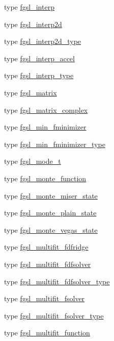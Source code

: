 \begin{DoxyCompactItemize}
\item 
type \hyperlink{structfgsl_1_1fgsl__interp}{fgsl\+\_\+interp}
\item 
type \hyperlink{structfgsl_1_1fgsl__interp2d}{fgsl\+\_\+interp2d}
\item 
type \hyperlink{structfgsl_1_1fgsl__interp2d__type}{fgsl\+\_\+interp2d\+\_\+type}
\item 
type \hyperlink{structfgsl_1_1fgsl__interp__accel}{fgsl\+\_\+interp\+\_\+accel}
\item 
type \hyperlink{structfgsl_1_1fgsl__interp__type}{fgsl\+\_\+interp\+\_\+type}
\item 
type \hyperlink{structfgsl_1_1fgsl__matrix}{fgsl\+\_\+matrix}
\item 
type \hyperlink{structfgsl_1_1fgsl__matrix__complex}{fgsl\+\_\+matrix\+\_\+complex}
\item 
type \hyperlink{structfgsl_1_1fgsl__min__fminimizer}{fgsl\+\_\+min\+\_\+fminimizer}
\item 
type \hyperlink{structfgsl_1_1fgsl__min__fminimizer__type}{fgsl\+\_\+min\+\_\+fminimizer\+\_\+type}
\item 
type \hyperlink{structfgsl_1_1fgsl__mode__t}{fgsl\+\_\+mode\+\_\+t}
\item 
type \hyperlink{structfgsl_1_1fgsl__monte__function}{fgsl\+\_\+monte\+\_\+function}
\item 
type \hyperlink{structfgsl_1_1fgsl__monte__miser__state}{fgsl\+\_\+monte\+\_\+miser\+\_\+state}
\item 
type \hyperlink{structfgsl_1_1fgsl__monte__plain__state}{fgsl\+\_\+monte\+\_\+plain\+\_\+state}
\item 
type \hyperlink{structfgsl_1_1fgsl__monte__vegas__state}{fgsl\+\_\+monte\+\_\+vegas\+\_\+state}
\item 
type \hyperlink{structfgsl_1_1fgsl__multifit__fdfridge}{fgsl\+\_\+multifit\+\_\+fdfridge}
\item 
type \hyperlink{structfgsl_1_1fgsl__multifit__fdfsolver}{fgsl\+\_\+multifit\+\_\+fdfsolver}
\item 
type \hyperlink{structfgsl_1_1fgsl__multifit__fdfsolver__type}{fgsl\+\_\+multifit\+\_\+fdfsolver\+\_\+type}
\item 
type \hyperlink{structfgsl_1_1fgsl__multifit__fsolver}{fgsl\+\_\+multifit\+\_\+fsolver}
\item 
type \hyperlink{structfgsl_1_1fgsl__multifit__fsolver__type}{fgsl\+\_\+multifit\+\_\+fsolver\+\_\+type}
\item 
type \hyperlink{structfgsl_1_1fgsl__multifit__function}{fgsl\+\_\+multifit\+\_\+function}

\end{DoxyCompactItemize}
